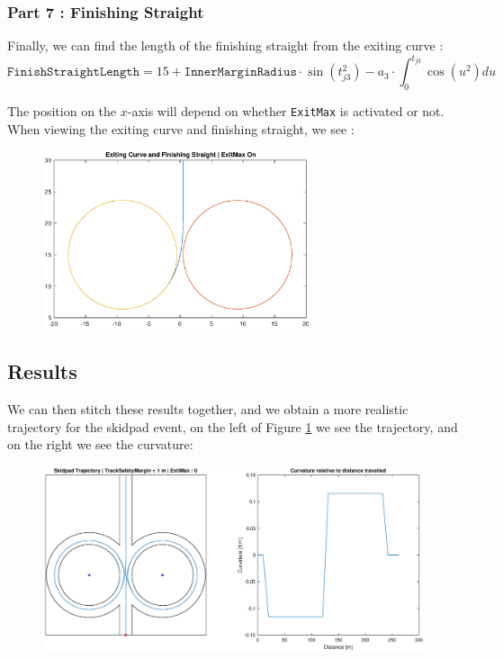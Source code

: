 \documentclass[a4paper, 11pt]{article}
\begin{document}
\subsubsection{Part 7 : Finishing Straight}

Finally, we can find the length of the finishing straight from the exiting curve :
\begin{equation}
	\texttt{FinishStraightLength} = 15 + \texttt{InnerMarginRadius}\cdot\sin\left(t_{j3}^2 \right) - a_3 \cdot \int_0^{t_{j3}} \cos\left(u^2 \right)du
\end{equation}

The position on the $x$-axis will depend on whether \texttt{ExitMax} is activated or not.\\

When viewing the exiting curve and finishing straight, we see :
\begin{figure}[H]
	\centering
	\includegraphics[trim = 2cm 2cm 1.5cm 1.8cm, clip, width = 0.7\textwidth]{Figures/ExitCurveFinishStraight}
\end{figure}

\subsection{Results}

We can then stitch these results together, and we obtain a more realistic trajectory for the skidpad event, on the left of Figure \ref{fig:SkidpadResultNoExitMax} we see the trajectory, and on the right we see the curvature:

\begin{figure}[H]
	\centering
	\includegraphics[trim = 4.5cm 0.5cm 3.1cm 0.6cm, clip, width = \textwidth]{Figures/SkidpadResultNoExitMax}
	\caption{ }
	\label{fig:SkidpadResultNoExitMax}
\end{figure}
\end{document}
